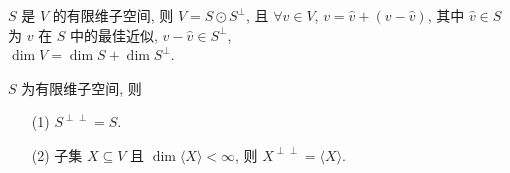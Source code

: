 \documentclass{note}
\begin{document}
\begin{thm}
    $S$ 是 $V$ 的有限维子空间, 则 $V=S\odot S^{\perp}$, 且 $\forall v\in V$, $v=\hat{v}+(v-\hat{v})$, 其中 $\hat{v}\in S$ 为 $v$ 在 $S$ 中的最佳近似, $v-\hat{v}\in S^{\perp}$,\\
    $\dim V=\dim S+\dim S^{\perp}$.
\end{thm}

\begin{thm}[(课本定理 9.12)]
    $S$ 为有限维子空间, 则
    \begin{itemize}
        \item[(1)] $S^{\perp\perp}=S$.
        \item[(2)] 子集 $X\subseteq V$ 且 $\dim\langle X\rangle<\infty$, 则 $X^{\perp\perp}=\langle X\rangle$.
    \end{itemize}
\end{thm}
\end{document}
